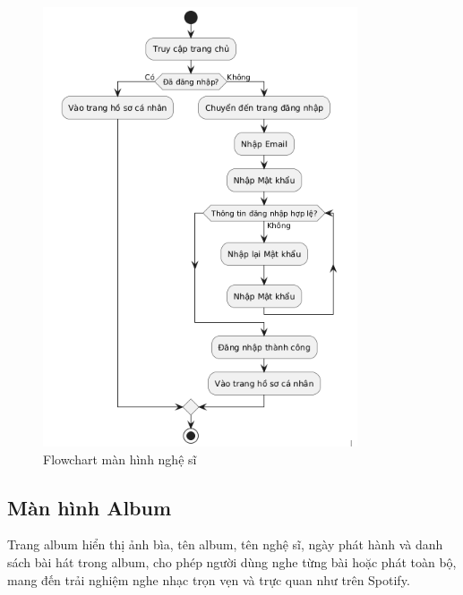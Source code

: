 \begin{figure}
    \centering
    \includegraphics[width=1\linewidth]{images/flowchart-nghe-si.png}
    \caption{Flowchart màn hình nghệ sĩ}
    \label{fig:flowchart-nghe-si}
\end{figure}

\subsection{Màn hình Album}
\label{subsec:album}

Trang album hiển thị ảnh bìa, tên album, tên nghệ sĩ, ngày phát hành và danh sách bài hát trong album, cho phép người dùng nghe từng bài hoặc phát toàn bộ, mang đến trải nghiệm nghe nhạc trọn vẹn và trực quan như trên Spotify.


